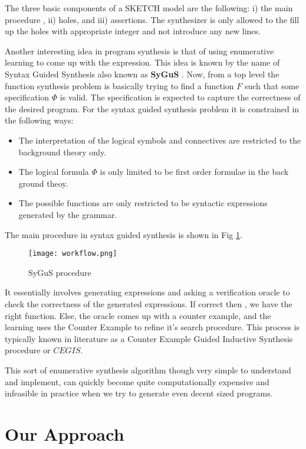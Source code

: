 \documentclass{article}
\begin{document}
The three basic components of a SKETCH model are the following: i) the main
procedure , ii) holes, and iii) assertions.  The synthesizer is only allowed to
the fill up the holes with appropriate integer and not introduce any new lines. 

Another interesting idea in program synthesis is that of using enumerative
learning to come up with the expression. This idea is known by the name of
Syntax Guided Synthesis also known as \textbf{SyGuS} \cite{sygus}. Now, from a
top level the function synthesis problem is basically trying to find a function
$F$ such that some specification $\Phi$ is valid. The specification is expected
to capture the correctness of the desired program. For the syntax guided
synthesis problem it is constrained in the following ways:

\begin{itemize}
    \item The interpretation of the logical symbols and connectives
	are restricted to the background theory only.
    \item The logical formula $\Phi$ is only limited to be first order formulae in
	the back ground theoy.
    \item The possible functions are only restricted to be syntactic expressions
	generated by the grammar.
\end{itemize}

The main procedure in syntax guided synthesis is shown in Fig \ref{sygus_fig}.  
\begin{figure}
\label{sygus_fig}
\texttt{[image: workflow.png]}
\caption{SyGuS procedure \cite{sygus}}
\end{figure}

It essentially involves generating expressions and asking a verification oracle
to check the correctness of the generated expressions. If correct then , we
have the right function. Else, the oracle comes up with a counter example, and
the learning uses the Counter Example to refine it's search procedure. This
process is typically known in literature as a Counter Example Guided Inductive
Synthesis procedure or $CEGIS$.

This sort of enumerative synthesis algorithm though very simple to understand
and implement, can quickly become quite computationally expensive and
infeasible in practice when we try to generate even decent sized programs.

\section{Our Approach}
\label{sec:approach}
\end{document}
